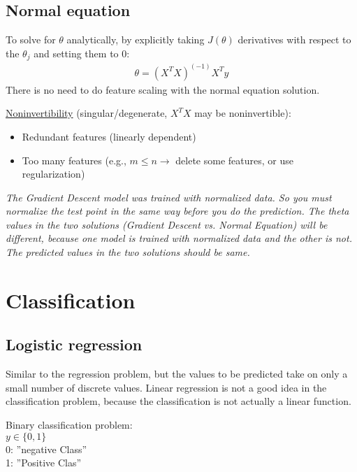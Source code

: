 %
\subsection{Normal equation}
To solve for $\theta$ analytically, by explicitly taking $J(\theta)$ derivatives with respect to the $\theta_j$ and setting them to 0:
\begin{align} 
\theta = (X^TX)^{(-1)}X^Ty
\end{align}
There is no need to do feature scaling with the normal equation solution.

\clearpage
\underline{Noninvertibility} (singular/degenerate, $X^TX$ may be noninvertible):
\begin{itemize}
\item Redundant features (linearly dependent)
\item Too many features (e.g., $m \leq n \rightarrow $ delete some features, or use regularization)
\end{itemize}

\emph{\textcolor{Bittersweet}{The Gradient Descent model was trained with normalized data. So you must normalize the test point in the same way before you do the prediction. The theta values in the two solutions (Gradient Descent vs. Normal Equation) will be different, because one model is trained with normalized data and the other is not. The predicted values in the two solutions should be same.}}

\section{Classification}
\label{sec:Classification}
%
\subsection{Logistic regression}
Similar to the regression problem, but the values to be predicted take on only a small number of discrete values. Linear regression is not a good idea in the classification problem, because the classification is not actually a linear function.

Binary classification problem:\\
$y \in \{0, 1\}$\\
0: ''negative Class''\\
1: ''Positive Clas''\\

